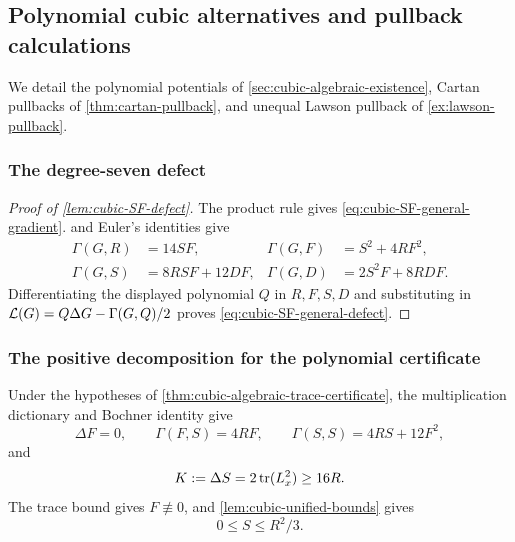 \subsection{Polynomial cubic alternatives and pullback calculations}
\label{app:application-details}
\label{app:Cartan-source-certificate}

We detail the polynomial potentials of
\cref{sec:cubic-algebraic-existence}, Cartan pullbacks of
\cref{thm:cartan-pullback}, and unequal Lawson pullback of
\cref{ex:lawson-pullback}.

\subsubsection*{The degree-seven defect}
\begin{proof}[Proof of \cref{lem:cubic-SF-defect}]
The product rule gives \eqref{eq:cubic-SF-general-gradient}.
 and Euler's identities give
\[
 \begin{aligned}
 \Gamma(G,R)&=14SF,& \Gamma(G,F)&=S^2+4RF^2,\\
 \Gamma(G,S)&=8RSF+12DF,& \Gamma(G,D)&=2S^2F+8RDF.
 \end{aligned}
\]
Differentiating the displayed polynomial \(Q\) in \(R,F,S,D\)
and substituting in \(\mathcal L(G)=Q\Delta G-\Gamma(G,Q)/2\)
proves \eqref{eq:cubic-SF-general-defect}.
\end{proof}

\subsubsection*{The positive decomposition for the polynomial certificate}
Under the hypotheses of \cref{thm:cubic-algebraic-trace-certificate},
the multiplication dictionary and Bochner identity give
\begin{equation}\label{eq:cubic-gradient-identities-only}
 \Delta F=0,\qquad
 \Gamma(F,S)=4RF,\qquad
 \Gamma(S,S)=4RS+12F^2,
\end{equation}
and
\begin{equation}\label{eq:cubic-variable-trace}
 K:=\Delta S=2\operatorname{tr}(L_x^2)\ge16R.
\end{equation}
The trace bound gives $F\not\equiv0$, and
\cref{lem:cubic-unified-bounds} gives
\begin{equation}\label{eq:cubic-gradient-only-S-bound}
 0\le S\le R^2/3.
\end{equation}

